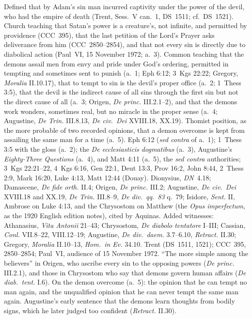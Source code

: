 {Defined that by Adam's sin man incurred captivity under the power of the
 devil, who had the empire of death (Trent, Sess.~V can.~1, DS~1511; cf.\
 DS~1521). Church teaching that Satan's power is a creature's, not
 infinite, and permitted by providence (CCC~395), that the last petition
 of the Lord's Prayer asks deliverance from him (CCC~2850--2854), and that
 not every sin is directly due to diabolical action (Paul~VI, 15 November
 1972; a.~3). Common teaching that the demons assail men from envy and
 pride under God's ordering, permitted in tempting and sometimes sent to
 punish (a.~1; Eph 6:12; 3~Kgs 22:22; Gregory, \emph{Moralia} II.10.17),
 that to tempt to sin is the devil's proper office (a.~2; 1~Thess 3:5),
 that the devil is the indirect cause of all sins through the first sin
 but not the direct cause of all (a.~3; Origen, \emph{De princ.}
 III.2.1--2), and that the demons work wonders, sometimes real, but no
 miracle in the proper sense (a.~4; Augustine, \emph{De Trin.} III.8.13,
 \emph{De civ.\ Dei} XVIII.18, XX.19). Thomist position, as the more
 probable of two recorded opinions, that a demon overcome is kept from
 assailing the same man for a time (a.~5).}
 {Eph 6:12 (\emph{sed contra} of a.~1); 1~Thess 3:5 with the gloss (a.~2);
 the \emph{De ecclesiasticis dogmatibus} (a.~3), Augustine's
 \emph{Eighty-Three Questions} (a.~4), and Matt 4:11 (a.~5), the
 \emph{sed contra} authorities; 3~Kgs 22:21--22, 4~Kgs 6:16, Gen 22:1,
 Deut 13:3, Prov 16:2, John 8:44, 2~Thess 2:9, Mark 16:20, Luke 4:13, Matt
 12:44 (Douay). Dionysius, \emph{DN}~4.18; Damascene, \emph{De fide orth.}
 II.4; Origen, \emph{De princ.} III.2; Augustine, \emph{De civ.\ Dei}
 XVIII.18 and XX.19, \emph{De Trin.} III.8--9, \emph{De div.\ qq.\ 83}
 q.~79; Isidore, \emph{Sent.} II, Ambrose on Luke 4:13, and the
 Chrysostom on Matthew (the \emph{Opus imperfectum}, as the 1920 English
 edition notes), cited by Aquinas. Added witnesses: Athanasius, \emph{Vita
 Antonii} 21--43; Chrysostom, \emph{De diabolo tentatore} I--III;
 Cassian, \emph{Conl.} VII.8--22, VIII.12--19; Augustine, \emph{De div.\
 daem.} 3.7--6.10, \emph{Retract.} II.30; Gregory, \emph{Moralia}
 II.10--13, \emph{Hom.\ in Ev.} 34.10. Trent (DS~1511, 1521); CCC~395,
 2850--2854; Paul~VI, audience of 15 November 1972.}
 {``The more simple among the believers'' in Origen, who ascribe every sin
 to the opposing powers (\emph{De princ.} III.2.1), and those in
 Chrysostom who say that demons govern human affairs (\emph{De diab.\
 tent.} I.6). On the
 demon overcome (a.~5): the opinion that he can tempt no man again, and
 the unqualified opinion that he can never tempt the same man again.
 Augustine's early sentence that the demons learn thoughts from bodily
 signs, which he later judged too confident (\emph{Retract.} II.30).}

